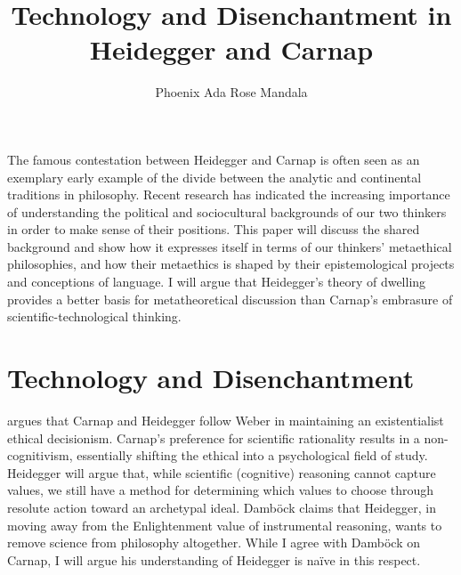 \documentclass[leqno, 12pt]{turabian-researchpaper}
\title{Technology and Disenchantment in Heidegger and Carnap}
\author{Phoenix Ada Rose Mandala}
\begin{document}
	\maketitle

	The famous contestation between Heidegger and Carnap is often seen as an
	exemplary early example of the divide between the analytic and continental
	traditions in philosophy. Recent research has indicated the increasing importance
	of understanding the political and sociocultural backgrounds of our two thinkers
	in order to make sense of their positions. This paper will discuss the shared
	background and show how it expresses itself in terms of our thinkers' metaethical
	philosophies, and how their metaethics is shaped by their epistemological
	projects and conceptions of language. I will argue that Heidegger's theory of dwelling
	provides a better basis for metatheoretical discussion than Carnap's embrasure
	of scientific-technological thinking.

	\section{Technology and Disenchantment}

	\autocite{dambock2022} argues that Carnap and Heidegger follow Weber in maintaining
	an existentialist ethical decisionism. Carnap's preference for scientific
	rationality results in a non-cognitivism, essentially shifting the ethical into
	a psychological field of study. Heidegger will argue that, while scientific (cognitive)
	reasoning cannot capture values, we still have a method for determining which
	values to choose through resolute action toward an archetypal ideal. Damb\"ock
	claims that Heidegger, in moving away from the Enlightenment value of
	instrumental reasoning, wants to remove science from philosophy altogether.
	While I agree with Damb\"ock on Carnap, I will argue his understanding of Heidegger
	is na\"ive in this respect.
\end{document}
